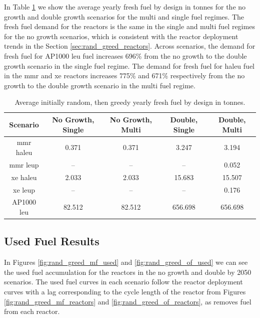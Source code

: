 In Table \ref{tab:rand_greed_fresh_avg} we show the average yearly fresh fuel by design in tonnes for the no growth and double growth scenarios for the multi and single fuel regimes. The fresh fuel demand for the reactors is the same in the single and multi fuel regimes for the no growth scenarios, which is consistent with the reactor deployment trends in the Section \ref{sec:rand_greed_reactors}. Across scenarios, the demand for fresh fuel for AP1000 \gls{leu} fuel increases 696\% from the no growth to the double growth scenario in the single fuel regime. The demand for fresh fuel for \gls{haleu} fuel in the \gls{mmr} and \gls{xe} reactors increases 775\% and 671\% respectively from the no growth to the double growth scenario in the multi fuel regime.

\begin{table}[H]
    \centering
    \caption{Average initially random, then greedy yearly fresh fuel by design in tonnes.}
    \label{tab:rand_greed_fresh_avg}
    \begin{tabular}{c c c c c}
       \hline
       Scenario & No Growth, Single & No Growth, Multi & Double, Single & Double, Multi  \\
       \hline
       \gls{mmr} \gls{haleu}   & 0.371    & 0.371   & 3.247    & 3.194    \\
       \gls{mmr} \gls{leup}    & --       & --      & --       & 0.052    \\
       \gls{xe} \gls{haleu}    & 2.033    & 2.033   & 15.683   & 15.507   \\
       \gls{xe} \gls{leup}     & --       & --      & --       & 0.176    \\
       AP1000 \gls{leu}        & 82.512   & 82.512  & 656.698  & 656.698  \\
       \hline
    \end{tabular}
\end{table}


\subsection{Used Fuel Results}
\label{sec:rand_greed_used}

In Figures \ref{fig:rand_greed_mf_used} and \ref{fig:rand_greed_of_used} we can see the used fuel accumulation for the reactors in the no growth and double by 2050 scenarios. The used fuel curves in each scenario follow the reactor deployment curves with a lag corresponding to the cycle length of the reactor from Figures \ref{fig:rand_greed_mf_reactors} and \ref{fig:rand_greed_of_reactors}, as \cyclus removes fuel from each reactor.


